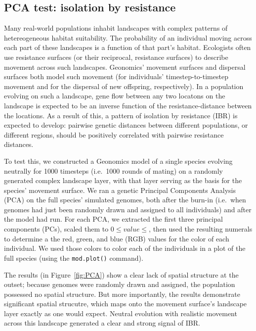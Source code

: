 ﻿\documentclass{article}
\begin{document}
\subsection{PCA test: isolation by resistance}
Many real-world populations inhabit landscapes with complex patterns
of hetereogeneous habitat suitability.
The probability of an individual moving across each part of these landscapes
is a function of that part's habitat.
Ecologists often use resistance surfaces (or their reciprocal, resistance surfaces)
to describe movement across such landscapes.
Geonomics' movement surfaces and dispersal surfaces both model such movement
(for individuals' timestep-to-timestep movement and for the dispersal of new
offspring, respectively).
In a population evolving on such a landscape, gene flow between any two locatons on the
landscape is expected to be an inverse function of the resistance-distance between the locations.
As a result of this, a pattern of isolation by resistance (IBR) is expected to develop:
pairwise genetic distances between different populations, or different regions, should be
positively correlated with pairwise resistance distances.

To test this, we constructed a Geonomics model of a single species evolving neutrally
for 1000 timesteps (i.e.\ 1000 rounds of mating) on a randomly generated complex landscape layer,
with that layer serving as the basis for the species' movement surface.
We ran a genetic Principal Components Analysis (PCA) on the full species' simulated genomes,
both after the burn-in (i.e.\ when genomes had just been randomly drawn and assigned to all individuals)
and after the model had run. For each PCA, we extracted the first three principal components (PCs),
scaled them to $0\leq value\leq$, then used the resulting numerals to determine a the
red, green, and blue (RGB) values for the color of each individual.
We used those colors to color each of the individuals in a plot of the full species (using the \texttt{mod.plot()} command).

The results (in Figure~\ref{fig:PCA}) show a clear lack of spatial structure at the outset; because genomes were randomly drawn and assigned,
the population possessed no spatial structure. But more importantly, the results demonstrate significant
spatial strucutre, which maps onto the movement surface's landscape layer exactly as one would expect.
Neutral evolution with realistic movement across this landscape generated a clear and strong signal of IBR.
\end{document}

